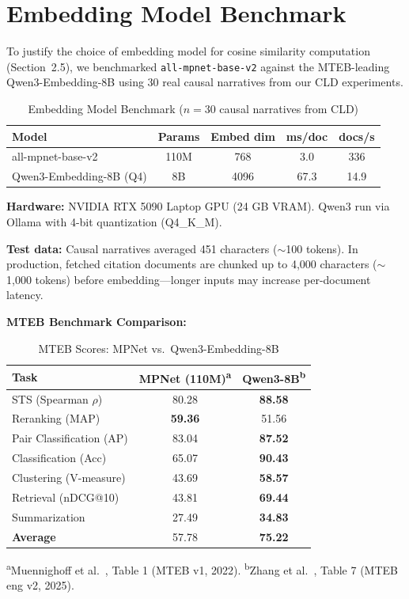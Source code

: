 \section{Embedding Model Benchmark}
\label{sec:embedding_benchmark}

To justify the choice of embedding model for cosine similarity computation (Section~2.5), we benchmarked \texttt{all-mpnet-base-v2} against the MTEB-leading Qwen3-Embedding-8B using 30 real causal narratives from our CLD experiments.

\begin{table}[H]
\centering
\caption{Embedding Model Benchmark ($n=30$ causal narratives from CLD)}
\label{tab:embed_benchmark}
\footnotesize
\begin{tabular}{@{}lcccc@{}}
\toprule
\textbf{Model} & \textbf{Params} & \textbf{Embed dim} & \textbf{ms/doc} & \textbf{docs/s} \\
\midrule
all-mpnet-base-v2 & 110M & 768 & 3.0 & 336 \\
Qwen3-Embedding-8B (Q4) & 8B & 4096 & 67.3 & 14.9 \\
\bottomrule
\end{tabular}
\end{table}

\textbf{Hardware:} NVIDIA RTX 5090 Laptop GPU (24 GB VRAM). Qwen3 run via Ollama with 4-bit quantization (Q4\_K\_M).

\textbf{Test data:} Causal narratives averaged 451 characters ($\sim$100 tokens). In production, fetched citation documents are chunked up to 4,000 characters ($\sim$1,000 tokens) before embedding---longer inputs may increase per-document latency.

\textbf{MTEB Benchmark Comparison:}

\begin{table}[H]
\centering
\caption{MTEB Scores: MPNet vs.\ Qwen3-Embedding-8B}
\label{tab:mteb_comparison}
\footnotesize
\begin{tabular}{@{}lcc@{}}
\toprule
\textbf{Task} & \textbf{MPNet (110M)\textsuperscript{a}} & \textbf{Qwen3-8B\textsuperscript{b}} \\
\midrule
STS (Spearman $\rho$) & 80.28 & \textbf{88.58} \\
Reranking (MAP) & \textbf{59.36} & 51.56 \\
Pair Classification (AP) & 83.04 & \textbf{87.52} \\
Classification (Acc) & 65.07 & \textbf{90.43} \\
Clustering (V-measure) & 43.69 & \textbf{58.57} \\
Retrieval (nDCG@10) & 43.81 & \textbf{69.44} \\
Summarization & 27.49 & \textbf{34.83} \\
\midrule
\textbf{Average} & 57.78 & \textbf{75.22} \\
\bottomrule
\end{tabular}

\vspace{0.3em}
\raggedright\scriptsize
\textsuperscript{a}Muennighoff et al.~\cite{muennighoff2023mteb}, Table 1 (MTEB v1, 2022). \textsuperscript{b}Zhang et al.~\cite{qwen3embedding2025}, Table 7 (MTEB eng v2, 2025).
\end{table}

